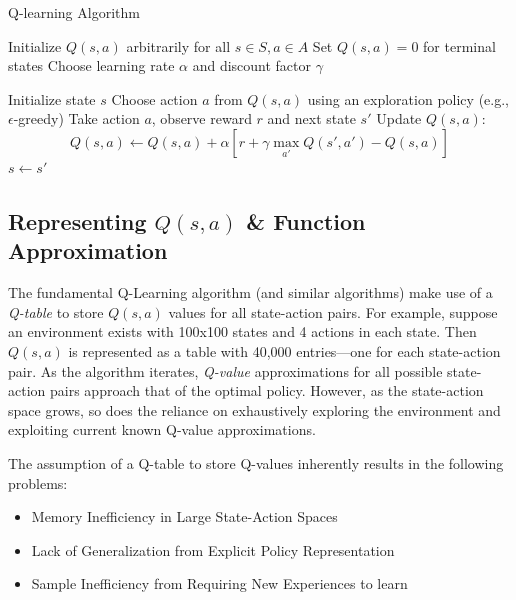 \documentclass{article}
\begin{document}
\begin{algorithm}
\caption{Q-learning Algorithm}
\label{alg:qlearning}
\begin{algorithmic}[1]
    \Require Initialize \( Q(s, a) \) arbitrarily for all \( s \in S, a \in A \)
    \Require Set \( Q(s, a) = 0 \) for terminal states
    \Require Choose learning rate \( \alpha \) and discount factor \( \gamma \)

        \State Initialize state \( s \)
            \State Choose action \( a \) from \( Q(s, a) \) using an exploration policy (e.g., \(\epsilon\)-greedy)
            \State Take action \( a \), observe reward \( r \) and next state \( s' \)
            \State Update \( Q(s, a) \):
            \[
            Q(s, a) \gets Q(s, a) + \alpha \left[ r + \gamma \max_{a'} Q(s', a') - Q(s, a) \right]
            \]
            \State \( s \gets s' \)
        \EndWhile
    \EndWhile
\end{algorithmic}
\end{algorithm}

\subsection{Representing $Q(s,a)$ \& Function Approximation}

The fundamental Q-Learning algorithm (and similar algorithms) make use of a \textit{Q-table} to store $Q(s,a)$ values for all state-action pairs. For example, suppose an environment exists with 100x100 states and 4 actions in each state. Then $Q(s,a)$ is represented as a table with 40,000 entries---one for each state-action pair. As the algorithm iterates, \textit{Q-value} approximations for all possible state-action pairs approach that of the optimal policy. However, as the state-action space grows, so does the reliance on exhaustively exploring the environment and exploiting current known Q-value approximations.

\pagebreak The assumption of a Q-table to store Q-values inherently results in the following problems:
\begin{itemize}
    \item Memory Inefficiency in Large State-Action Spaces
    \item Lack of Generalization from Explicit Policy Representation
    \item Sample Inefficiency from Requiring New Experiences to learn
\end{itemize}
\end{document}
